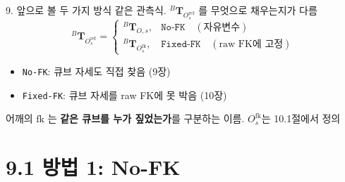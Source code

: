 \documentclass[aspectratio=169,11pt]{beamer}
\newif\ifcorrectedfk
\newcommand{\T}[3][]{{}^{#2}\mathbf{T}^{#1}_{#3}}   %
\newcommand{\Oref}{O^{\mathrm{ref}}}   %
\newcommand{\Ofk}{O^{\mathrm{fk}}}     %
\newcommand{\Oanc}{O^{\mathrm{anc}}}   %
\begin{document}
\ifcorrectedfk
\begin{frame}{9. 앞으로 볼 세 가지 방식}
  같은 관측식. $\T{B}{\Oref_s}$ 를 무엇으로 채우는지가 다름
  \[
    \T{B}{\Oref_s}=
    \begin{cases}
      \T{B}{O,s}, & \texttt{No-FK} \quad (\text{자유변수}) \\[4pt]
      \T{B}{\Ofk_s}, & \texttt{Fixed-FK} \quad (\text{raw FK에 고정}) \\[4pt]
      \T{B}{\Oanc_s}, & \texttt{Corrected-FK} \quad (\text{보정된 anchor에 고정})
    \end{cases}
  \]
  \vfill
  \begin{itemize}
    \item \texttt{No-FK}: 큐브 자세도 직접 찾음 \hfill (9장)
    \item \texttt{Fixed-FK}: 큐브 자세를 raw FK에 못 박음 \hfill (10장)
    \item \texttt{Corrected-FK}: raw FK를 vision으로 보정,
      gate 통과 세트에서만 사용 \hfill (11장)
  \end{itemize}
  \vfill
  {\small 어깨의 $\mathrm{fk}$, $\mathrm{anc}$ 는
  \textbf{같은 큐브를 누가 어떻게 짚었는가}를 구분하는 이름.
  $\Ofk_s$는 10.1절, $\Oanc_s$는 11.7절에서 정의}
\end{frame}
\else
\begin{frame}{9. 앞으로 볼 두 가지 방식}
  같은 관측식. $\T{B}{\Oref_s}$ 를 무엇으로 채우는지가 다름
  \[
    \T{B}{\Oref_s}=
    \begin{cases}
      \T{B}{O,s}, & \texttt{No-FK} \quad (\text{자유변수}) \\[4pt]
      \T{B}{\Ofk_s}, & \texttt{Fixed-FK} \quad (\text{raw FK에 고정})
    \end{cases}
  \]
  \vfill
  \begin{itemize}
    \item \texttt{No-FK}: 큐브 자세도 직접 찾음 \hfill (9장)
    \item \texttt{Fixed-FK}: 큐브 자세를 raw FK에 못 박음 \hfill (10장)
  \end{itemize}
  \vfill
  {\small 어깨의 $\mathrm{fk}$ 는 \textbf{같은 큐브를 누가 짚었는가}를 구분하는 이름.
  $\Ofk_s$는 10.1절에서 정의}
\end{frame}
\fi

\section{9.1 방법 1: No-FK}
\end{document}
